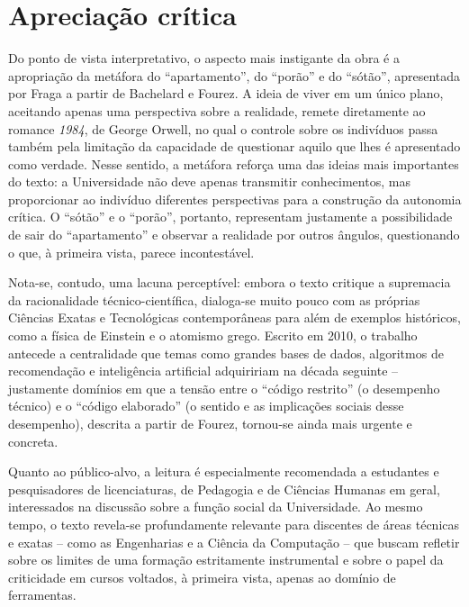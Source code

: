 \documentclass[12pt]{article}
\begin{document}
\section*{Apreciação crítica}

Do ponto de vista interpretativo, o aspecto mais instigante da obra é a apropriação da metáfora do ``apartamento'', do ``porão'' e do ``sótão'', apresentada por Fraga a partir de Bachelard e Fourez. A ideia de viver em um único plano, aceitando apenas uma perspectiva sobre a realidade, remete diretamente ao romance \emph{1984}, de George Orwell, no qual o controle sobre os indivíduos passa também pela limitação da capacidade de questionar aquilo que lhes é apresentado como verdade. Nesse sentido, a metáfora reforça uma das ideias mais importantes do texto: a Universidade não deve apenas transmitir conhecimentos, mas proporcionar ao indivíduo diferentes perspectivas para a construção da autonomia crítica. O ``sótão'' e o ``porão'', portanto, representam justamente a possibilidade de sair do ``apartamento'' e observar a realidade por outros ângulos, questionando o que, à primeira vista, parece incontestável.

Nota-se, contudo, uma lacuna perceptível: embora o texto critique a supremacia da racionalidade técnico-científica, dialoga-se muito pouco com as próprias Ciências Exatas e Tecnológicas contemporâneas para além de exemplos históricos, como a física de Einstein e o atomismo grego. Escrito em 2010, o trabalho antecede a centralidade que temas como grandes bases de dados, algoritmos de recomendação e inteligência artificial adquiririam na década seguinte -- justamente domínios em que a tensão entre o ``código restrito'' (o desempenho técnico) e o ``código elaborado'' (o sentido e as implicações sociais desse desempenho), descrita a partir de Fourez, tornou-se ainda mais urgente e concreta.

Quanto ao público-alvo, a leitura é especialmente recomendada a estudantes e pesquisadores de licenciaturas, de Pedagogia e de Ciências Humanas em geral, interessados na discussão sobre a função social da Universidade. Ao mesmo tempo, o texto revela-se profundamente relevante para discentes de áreas técnicas e exatas -- como as Engenharias e a Ciência da Computação -- que buscam refletir sobre os limites de uma formação estritamente instrumental e sobre o papel da criticidade em cursos voltados, à primeira vista, apenas ao domínio de ferramentas.
\end{document}
